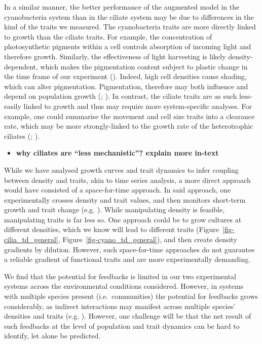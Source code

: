 \documentclass[
  letterpaper,
  DIV=11,
  numbers=noendperiod]{scrartcl}
\providecommand{\tightlist}{%
  \setlength{\itemsep}{0pt}\setlength{\parskip}{0pt}}\usepackage{longtable,booktabs,array}
\begin{document}
In a similar manner, the better performance of the augmented model in
the cyanobacteria system than in the ciliate system may be due to
differences in the kind of the traits we measured. The cyanobacteria
traits are more directly linked to growth than the ciliate traits. For
example, the concentration of photosynthetic pigments within a cell
controls absorption of incoming light and therefore growth. Similarly,
the effectiveness of light harvesting is likely density-dependent, which
makes the pigmentation content subject to plastic change in the time
frame of our experiment ().
Indeed, high cell densities cause shading, which can alter pigmentation.
Pigmentation, therefore may both influence and depend on population
growth (;
). In contrast, the ciliate
traits are as such less-easily linked to growth and thus may require
more system-specific analyses. For example, one could summarise the
movement and cell size traits into a clearance rate, which may be more
strongly-linked to the growth rate of the heterotrophic ciliates
(;
).

\begin{itemize}
\tightlist
\item
  \textbf{why ciliates are ``less mechanistic''? explain more in-text}
\end{itemize}

While we have analysed growth curves and trait dynamics to infer
coupling between density and traits, akin to time series analysis, a
more direct approach would have consisted of a space-for-time approach.
In said approach, one experimentally crosses density and trait values,
and then monitors short-term growth and trait change (e.g.
). While
manipulating density is feasible, manipulating traits is far less so.
One approach could be to grow cultures at different densities, which we
know will lead to different traits (Figure~\ref{fig-cilia_td_general},
Figure~\ref{fig-cyano_td_general}), and then create density gradients by
dilution. However, such space-for-time approaches do not guarantee a
reliable gradient of functional traits and are more experimentally
demanding.

We find that the potential for feedbacks is limited in our two
experimental systems across the environmental conditions considered.
However, in systems with multiple species present (i.e.~communities) the
potential for feedbacks grows considerably, as indirect interactions may
manifest across multiple species' densities and traits (e.g.
). However, one challenge
will be that the net result of such feedbacks at the level of population
and trait dynamics can be hard to identify, let alone be predicted.
\end{document}
